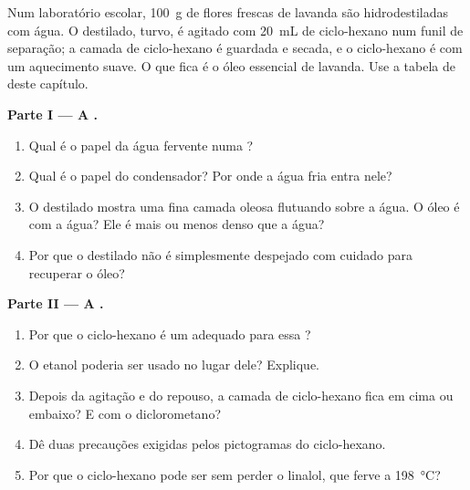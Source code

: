 \begin{problem}
\label{pb:g10:chemical-species:1}
Num laboratório escolar, \qty{100}{g} de flores frescas de lavanda são
hidrodestiladas com água. O destilado, turvo, é agitado com \qty{20}{mL}
de ciclo-hexano num funil de separação; a camada de ciclo-hexano é
guardada e secada, e o ciclo-hexano é  com um aquecimento
suave. O que fica é o óleo essencial de lavanda. Use a tabela de
 deste capítulo.

\medskip
\noindent\textbf{Parte I --- A .}
\begin{enumerate}
  \item Qual é o papel da água fervente numa ?
  \item Qual é o papel do condensador? Por onde a água fria entra nele?
  \item O destilado mostra uma fina camada oleosa flutuando sobre a água.
        O óleo é  com a água? Ele é mais ou menos denso que a
        água?
  \item Por que o destilado não é simplesmente despejado com cuidado para
        recuperar o óleo?
\end{enumerate}

\medskip
\noindent\textbf{Parte II --- A .}
\begin{enumerate}[resume]
  \item Por que o ciclo-hexano é um  adequado para essa ?
  \item O etanol poderia ser usado no lugar dele? Explique.
  \item Depois da agitação e do repouso, a camada de ciclo-hexano fica em
        cima ou embaixo? E com o diclorometano?
  \item Dê duas precauções exigidas pelos pictogramas do ciclo-hexano.
  \item Por que o ciclo-hexano pode ser  sem perder o linalol, que ferve a \qty{198}{\celsius}?
\end{enumerate}


\end{problem}
